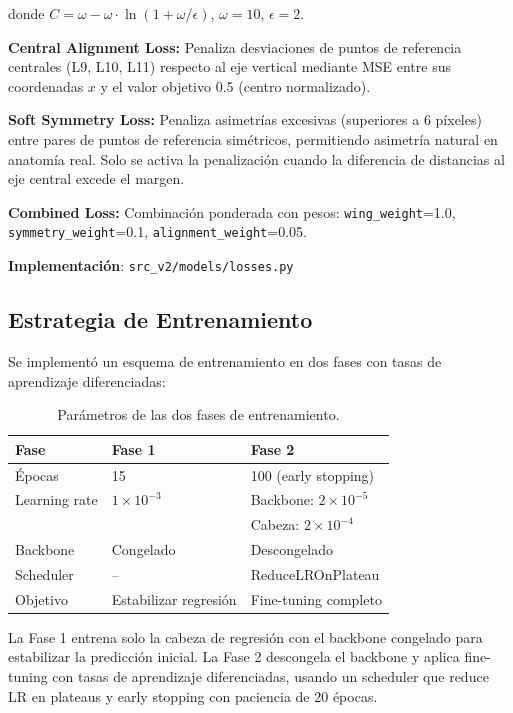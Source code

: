 \documentclass[12pt,a4paper]{article}
\newcommand{\code}[1]{\texttt{#1}}
\begin{document}
donde $C = \omega - \omega \cdot \ln(1 + \omega/\epsilon)$, $\omega=10$, $\epsilon=2$.

\textbf{Central Alignment Loss:} Penaliza desviaciones de puntos de referencia centrales (L9, L10, L11) respecto al eje vertical mediante MSE entre sus coordenadas $x$ y el valor objetivo 0.5 (centro normalizado).

\textbf{Soft Symmetry Loss:} Penaliza asimetrías excesivas (superiores a 6 píxeles) entre pares de puntos de referencia simétricos, permitiendo asimetría natural en anatomía real. Solo se activa la penalización cuando la diferencia de distancias al eje central excede el margen.

\textbf{Combined Loss:} Combinación ponderada con pesos: \code{wing\_weight}=1.0, \code{symmetry\_weight}=0.1, \code{alignment\_weight}=0.05.

\textbf{Implementación}: \code{src\_v2/models/losses.py}

\subsection{Estrategia de Entrenamiento}

Se implementó un esquema de entrenamiento en dos fases con tasas de aprendizaje diferenciadas:

\begin{table}[H]
\centering
\begin{tabular}{lll}
\toprule
\textbf{Fase} & \textbf{Fase 1} & \textbf{Fase 2} \\
\midrule
Épocas & 15 & 100 (early stopping) \\
Learning rate & $1 \times 10^{-3}$ & Backbone: $2 \times 10^{-5}$ \\
 &  & Cabeza: $2 \times 10^{-4}$ \\
Backbone & Congelado & Descongelado \\
Scheduler & -- & ReduceLROnPlateau \\
Objetivo & Estabilizar regresión & Fine-tuning completo \\
\bottomrule
\end{tabular}
\caption{Parámetros de las dos fases de entrenamiento.}
\end{table}

La Fase 1 entrena solo la cabeza de regresión con el backbone congelado para estabilizar la predicción inicial. La Fase 2 descongela el backbone y aplica fine-tuning con tasas de aprendizaje diferenciadas, usando un scheduler que reduce LR en plateaus y early stopping con paciencia de 20 épocas.
\end{document}
